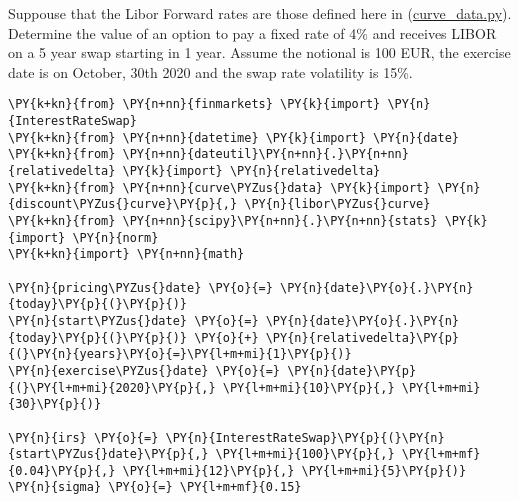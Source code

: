\begin{Exercise}[title={(Analytic bootstrapping)}]
Suppouse that the Libor Forward rates are those defined here in
(\href{https://repl.it/@MatteoSani/support6}{curve\_data.py}).
Determine the value of an option to pay a fixed rate of 4\% and receives
LIBOR on a 5 year swap starting in 1 year. Assume the notional is 100
EUR, the exercise date is on October, 30th 2020 and the swap rate
volatility is 15\%.
\end{Exercise}
\begin{Answer}
\begin{tcolorbox}[size=fbox, boxrule=1pt, colback=cellbackground, colframe=cellborder]
\begin{Verbatim}[commandchars=\\\{\}]
\PY{k+kn}{from} \PY{n+nn}{finmarkets} \PY{k}{import} \PY{n}{InterestRateSwap}
\PY{k+kn}{from} \PY{n+nn}{datetime} \PY{k}{import} \PY{n}{date}
\PY{k+kn}{from} \PY{n+nn}{dateutil}\PY{n+nn}{.}\PY{n+nn}{relativedelta} \PY{k}{import} \PY{n}{relativedelta}
\PY{k+kn}{from} \PY{n+nn}{curve\PYZus{}data} \PY{k}{import} \PY{n}{discount\PYZus{}curve}\PY{p}{,} \PY{n}{libor\PYZus{}curve}
\PY{k+kn}{from} \PY{n+nn}{scipy}\PY{n+nn}{.}\PY{n+nn}{stats} \PY{k}{import} \PY{n}{norm}
\PY{k+kn}{import} \PY{n+nn}{math}

\PY{n}{pricing\PYZus{}date} \PY{o}{=} \PY{n}{date}\PY{o}{.}\PY{n}{today}\PY{p}{(}\PY{p}{)}
\PY{n}{start\PYZus{}date} \PY{o}{=} \PY{n}{date}\PY{o}{.}\PY{n}{today}\PY{p}{(}\PY{p}{)} \PY{o}{+} \PY{n}{relativedelta}\PY{p}{(}\PY{n}{years}\PY{o}{=}\PY{l+m+mi}{1}\PY{p}{)}
\PY{n}{exercise\PYZus{}date} \PY{o}{=} \PY{n}{date}\PY{p}{(}\PY{l+m+mi}{2020}\PY{p}{,} \PY{l+m+mi}{10}\PY{p}{,} \PY{l+m+mi}{30}\PY{p}{)}

\PY{n}{irs} \PY{o}{=} \PY{n}{InterestRateSwap}\PY{p}{(}\PY{n}{start\PYZus{}date}\PY{p}{,} \PY{l+m+mi}{100}\PY{p}{,} \PY{l+m+mf}{0.04}\PY{p}{,} \PY{l+m+mi}{12}\PY{p}{,} \PY{l+m+mi}{5}\PY{p}{)}
\PY{n}{sigma} \PY{o}{=} \PY{l+m+mf}{0.15}


\end{Verbatim}
\end{tcolorbox}
\end{Answer}
